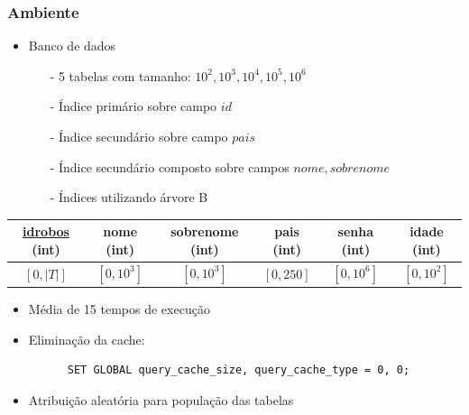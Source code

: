 \documentclass[10pt]{beamer}
\begin{document}
\begin{frame}[fragile]
  \frametitle{Ambiente}

  \begin{itemize}
    \item Banco de dados
    \begin{itemize}
      \item[-] 5 tabelas com tamanho: $10^2, 10^3, 10^4, 10^5, 10^6$
      \item[-] Índice primário sobre campo $id$
      \item[-] Índice secundário sobre campo $pais$
      \item[-] Índice secundário composto sobre campos $nome, sobrenome$
      \item[-] Índices utilizando árvore B
    \end{itemize}
  \end{itemize}

  \begin{table}[!htb]
    \footnotesize
    \centering
    \begin{tabular}{cccccc}
      \toprule
      \textbf{\underline{idrobos} (int)} & \textbf{nome (int)}  & \textbf{sobrenome (int)}  & \textbf{pais (int)} & \textbf{senha (int)} & \textbf{idade (int)}  \\
       \midrule
      $[0, |T|]$ & $[0, 10^3]$ & $[0, 10^3]$ & $[0, 250]$ & $[0, 10^6]$ & $[0, 10^2]$ \\
      \bottomrule
    \end{tabular}
   \end{table}


   \begin{itemize}
    
      \item Média de 15 tempos de execução
      \item Eliminação da cache:
      \begin{verbatim}
      SET GLOBAL query_cache_size, query_cache_type = 0, 0;
      \end{verbatim}
      \item Atribuição aleatória para população das tabelas
    
  \end{itemize}

\end{frame}
\end{document}

